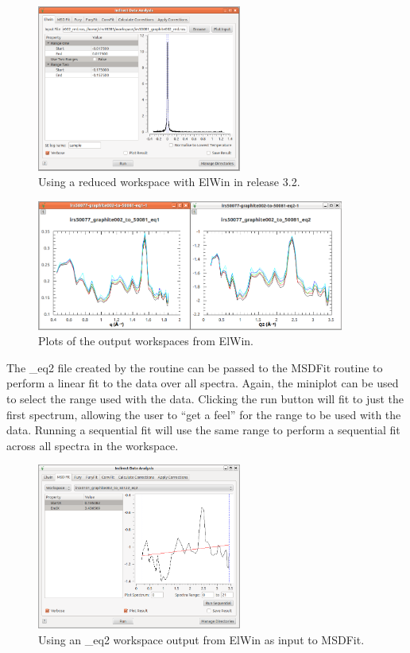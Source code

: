 \documentclass[paper=a4, fontsize=11pt]{scrartcl}	%
\numberwithin{equation}{section}															%
\numberwithin{figure}{section}																%
\numberwithin{table}{section}																%
\begin{document}
\begin{figure}[H]
\centering
\includegraphics[width=0.6\textwidth]{img/iris-ida-elwin.png}
\caption{Using a reduced workspace with ElWin in release 3.2.}
\label{fig:iris-ida-elwin}
\end{figure}

\begin{figure}[H]
\centering
\includegraphics[width=0.9\textwidth]{img/iris-ida-elwin-output.png}
\caption{Plots of the output workspaces from ElWin.}
\label{fig:iris-ida-elwin-output}
\end{figure}

The \*\_eq2 file created by the routine can be passed to the MSDFit routine to perform a linear fit to the data over all spectra. Again, the miniplot can be used to select the range used with the data. Clicking the run button will fit to just the first spectrum, allowing the user to ``get a feel'' for the range to be used with the data. Running a sequential fit will use the same range to perform a sequential fit across all spectra in the workspace.

\begin{figure}[H]
\centering
\includegraphics[width=0.6\textwidth]{img/iris-ida-msd.png}
\caption{Using an \*\_eq2 workspace output from ElWin as input to MSDFit.}
\label{fig:iris-ida-msd}
\end{figure}
\end{document}
